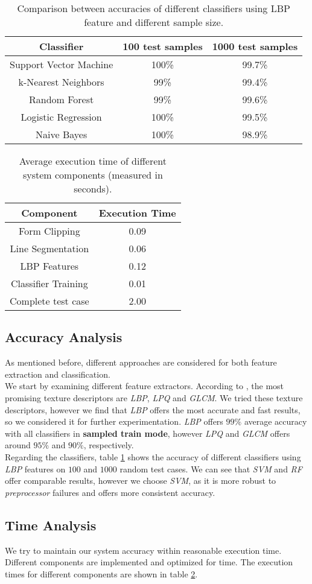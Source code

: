\begin{table}[h!]
\centering
\begin{tabular}{||c | c | c||}
 \hline
 Classifier & 100 test samples & 1000 test samples \\ [0.5ex] 
 \hline\hline
 Support Vector Machine & 100\% & 99.7\% \\ 
 \hline
 k-Nearest Neighbors & 99\% & 99.4\% \\
 \hline
 Random Forest & 99\% & 99.6\% \\
 \hline
 Logistic Regression & 100\% & 99.5\% \\
 \hline
 Naive Bayes & 100\% & 98.9\% \\ [1ex] 
 \hline
\end{tabular}
\caption{Comparison between accuracies of different classifiers using LBP feature and different sample size.}
\label{table:1}
\end{table}

\begin{table}[h!]
\centering
\begin{tabular}{||c | c||}
 \hline
 Component & Execution Time \\ [0.5ex] 
 \hline\hline
 Form Clipping & 0.09 \\ 
 \hline
 Line Segmentation & 0.06 \\
 \hline
 LBP Features & 0.12 \\
 \hline
 Classifier Training & 0.01 \\
 \hline
 Complete test case & 2.00 \\ [1ex] 
 \hline
\end{tabular}
\caption{Average execution time of different system components (measured in seconds).}
\label{table:2}
\end{table}

\subsection{Accuracy Analysis}
As mentioned before, different approaches are considered for both feature extraction and classification. \\
We start by examining different feature extractors. According to \cite{c1}, the most promising texture descriptors are \emph{LBP}, \emph{LPQ} and \emph{GLCM}. We tried these texture descriptors, however we find that \emph{LBP} offers the most accurate and fast results, so we considered it for further experimentation. \emph{LBP} offers $99\%$ average accuracy with all classifiers in \textbf{sampled train mode}, however \emph{LPQ} and \emph{GLCM} offers around $95\%$ and $90\%$, respectively. \\
Regarding the classifiers, table \ref{table:1} shows the accuracy of different classifiers using \emph{LBP} features on $100$ and $1000$ random test cases. We can see that \emph{SVM} and \emph{RF} offer comparable results, however we choose \emph{SVM}, as it is more robust to \emph{preprocessor} failures and offers more consistent accuracy.

\subsection{Time Analysis}
We try to maintain our system accuracy within reasonable execution time. Different components are implemented and optimized for time. The execution times for different components are shown in table \ref{table:2}.
